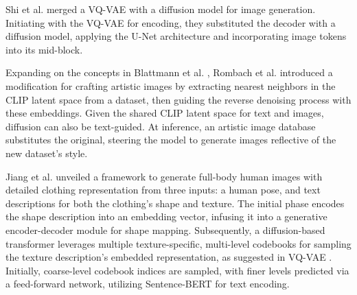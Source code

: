 Shi et al. \cite{shi2022divae} merged a VQ-VAE \cite{oord2017neural} with a diffusion model for image generation. Initiating with the VQ-VAE for encoding, they substituted the decoder with a diffusion model, applying the U-Net architecture \cite{nichol2021improved} and incorporating image tokens into its mid-block.

Expanding on the concepts in Blattmann et al. \cite{blattmann2022retrieval}, Rombach et al. \cite{rombach2022textguided} introduced a modification for crafting artistic images by extracting nearest neighbors in the CLIP \cite{radford2021learning} latent space from a dataset, then guiding the reverse denoising process with these embeddings. Given the shared CLIP latent space for text and images, diffusion can also be text-guided. At inference, an artistic image database substitutes the original, steering the model to generate images reflective of the new dataset's style.

Jiang et al. \cite{jiang2022text2human} unveiled a framework to generate full-body human images with detailed clothing representation from three inputs: a human pose, and text descriptions for both the clothing's shape and texture. The initial phase encodes the shape description into an embedding vector, infusing it into a generative encoder-decoder module for shape mapping. Subsequently, a diffusion-based transformer leverages multiple texture-specific, multi-level codebooks for sampling the texture description's embedded representation, as suggested in VQ-VAE \cite{oord2017neural}. Initially, coarse-level codebook indices are sampled, with finer levels predicted via a feed-forward network, utilizing Sentence-BERT \cite{reimers2019sentencebert} for text encoding.

